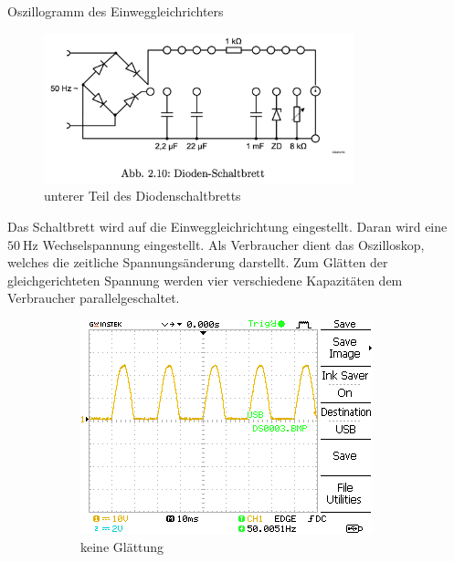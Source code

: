\documentclass{article}
\theoremstyle{definition}
\begin{document}
\begin{aufgabe}{Oszillogramm des Einweggleichrichters}
    \aufbau
    \begin{figure}[H]
        \centering
        \includegraphics[width=0.8\textwidth]{figs/Aufbau3.png}
        \caption{unterer Teil des Diodenschaltbretts\cite{anleitung}}
        \label{aufbau3}
    \end{figure}
    Das Schaltbrett wird auf die Einweggleichrichtung eingestellt. Daran wird eine $\SI{50}{\hertz}$ Wechselspannung eingestellt. Als Verbraucher dient das Oszilloskop, welches die zeitliche Spannungsänderung darstellt. Zum Glätten der gleichgerichteten Spannung werden vier verschiedene Kapazitäten dem Verbraucher parallelgeschaltet.
    \messwerte
    \begin{figure}[H]
        \begin{subfigure}[b]{0.49 \textwidth}
            \includegraphics[width=\textwidth]{MesswerteVersuch2/DS0003.png}
            \caption{keine Glättung}
            \label{a3_a}
        \end{subfigure}
        \hfill
        \begin{subfigure}[b]{0.49 \textwidth}

\end{subfigure}
\end{figure}
\end{aufgabe}
\end{document}
